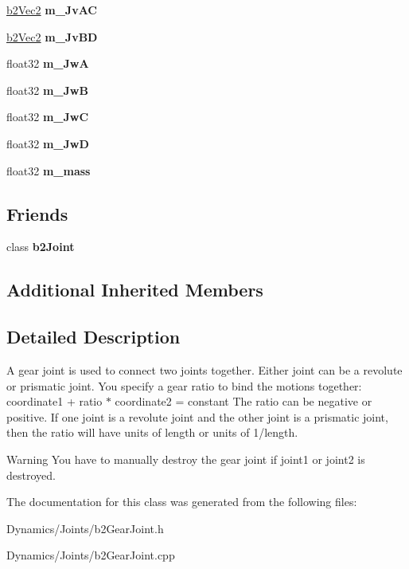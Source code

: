 \begin{DoxyCompactItemize}
\mbox{\hyperlink{structb2Vec2}{b2\+Vec2}} {\bfseries m\+\_\+\+Jv\+AC}
\item 
\mbox{\label{classb2GearJoint_ab00b00c061d8b9e461f76ac4d72aac8c}} 
\mbox{\hyperlink{structb2Vec2}{b2\+Vec2}} {\bfseries m\+\_\+\+Jv\+BD}
\item 
\mbox{\label{classb2GearJoint_a3774fc69538e658f123d9437934aed70}} 
float32 {\bfseries m\+\_\+\+JwA}
\item 
\mbox{\label{classb2GearJoint_afcdb0ebe31ff8039771d006f4b87645c}} 
float32 {\bfseries m\+\_\+\+JwB}
\item 
\mbox{\label{classb2GearJoint_ac9b8f418c8f79392049afdf18aa6dc3e}} 
float32 {\bfseries m\+\_\+\+JwC}
\item 
\mbox{\label{classb2GearJoint_ac2d00521ef5f7c27b1747ad54d4ad5c2}} 
float32 {\bfseries m\+\_\+\+JwD}
\item 
\mbox{\label{classb2GearJoint_a71ac3578918bc97d257d652777b6b87f}} 
float32 {\bfseries m\+\_\+mass}
\end{DoxyCompactItemize}
\subsection*{Friends}
\begin{DoxyCompactItemize}
\item 
\mbox{\label{classb2GearJoint_a54ade8ed3d794298108d7f4c4e4793fa}} 
class {\bfseries b2\+Joint}
\end{DoxyCompactItemize}
\subsection*{Additional Inherited Members}


\subsection{Detailed Description}
A gear joint is used to connect two joints together. Either joint can be a revolute or prismatic joint. You specify a gear ratio to bind the motions together\+: coordinate1 + ratio $\ast$ coordinate2 = constant The ratio can be negative or positive. If one joint is a revolute joint and the other joint is a prismatic joint, then the ratio will have units of length or units of 1/length. \begin{DoxyWarning}{Warning}
You have to manually destroy the gear joint if joint1 or joint2 is destroyed. 
\end{DoxyWarning}


The documentation for this class was generated from the following files\+:\begin{DoxyCompactItemize}
\item 
Dynamics/\+Joints/b2\+Gear\+Joint.\+h\item 
Dynamics/\+Joints/b2\+Gear\+Joint.\+cpp\end{DoxyCompactItemize}
